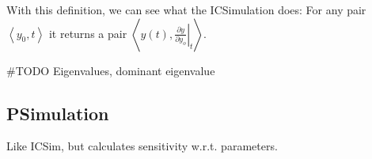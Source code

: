 With this definition, we can see what the ICSimulation does: For any
pair $\left\langle y_{0},t\right\rangle $ it returns a pair $\left\langle y(t),\left.\frac{\partial y}{\partial y_{o}}\right|_{t}\right\rangle $.

\#TODO Eigenvalues, dominant eigenvalue


\subsection{PSimulation}

Like ICSim, but calculates sensitivity w.r.t. parameters.

